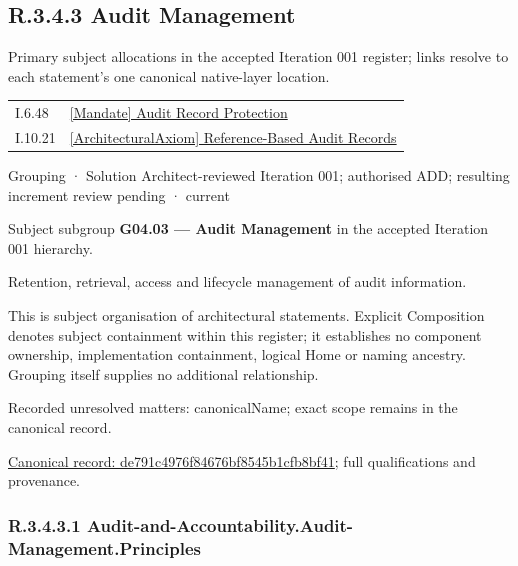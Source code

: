 \subsection*{R.3.4.3 Audit Management}
\label{navigation:R.3.4.3}

Primary subject allocations in the accepted Iteration 001 register; links resolve to each statement’s one canonical native-layer location.\par
\begin{longtable}{p{.22\linewidth}p{.73\linewidth}}
I.6.48 & \hyperref[element:de15359269cf45adb646a435c18306f8]{[Mandate] Audit Record Protection} \\
I.10.21 & \hyperref[element:9202f9b1adf84d4882a507a2d7280710]{[ArchitecturalAxiom] Reference-Based Audit Records} \\
\end{longtable}
\label{element:de791c4976f84676bf8545b1cfb8bf41}
{\small Grouping · Solution Architect-reviewed Iteration 001; authorised ADD; resulting increment review pending · current}\par

Subject subgroup \textbf{G04.03 — Audit Management} in the accepted Iteration 001 hierarchy.



Retention, retrieval, access and lifecycle management of audit information.



This is subject organisation of architectural statements. Explicit Composition denotes subject containment within this register; it establishes no component ownership, implementation containment, logical Home or naming ancestry. Grouping itself supplies no additional relationship.


{\small Recorded unresolved matters: canonicalName; exact scope remains in the canonical record.}\par
{\footnotesize \href{../../../../continuum/grouping/de791c4976f84676bf8545b1cfb8bf41.md}{Canonical record: de791c4976f84676bf8545b1cfb8bf41}; full qualifications and provenance.}\par
\subsubsection*{R.3.4.3.1 Audit-and-Accountability.Audit-Management.Principles}
\label{navigation:R.3.4.3.1}

